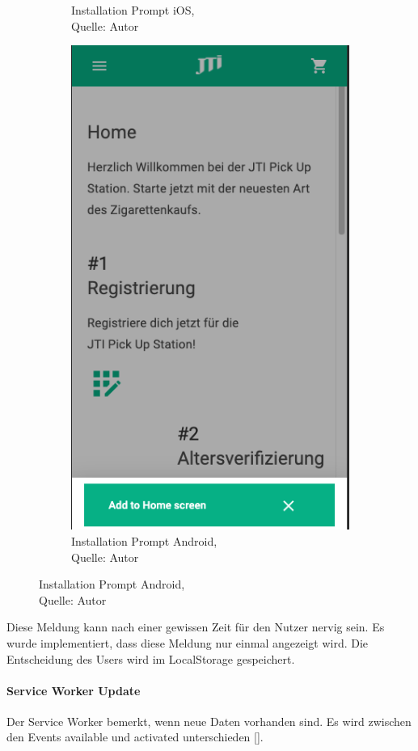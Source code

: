 \begin{figure}[H]
\begin{subfigure}[b]{0.5\textwidth}
		\caption[Installation Prompt iOS]{Installation Prompt iOS,\\ Quelle: Autor}
		\label{img: promptIOS}
	\end{subfigure}
	\hfill
	\begin{subfigure}[b]{0.5\textwidth}
		\includegraphics[scale=0.5]{images/promptAndroid.png}
		\caption[Installation Prompt Android]{Installation Prompt Android,\\ Quelle: Autor}
		\label{img: promptAndroid}
	\end{subfigure}
\end{figure} 

Diese Meldung kann nach einer gewissen Zeit für den Nutzer nervig sein. Es wurde implementiert, dass diese Meldung nur einmal angezeigt wird. Die Entscheidung des Users wird im \gls{LocalStorage} gespeichert. 
\paragraph{Service Worker Update}
Der Service Worker bemerkt, wenn neue Daten vorhanden sind. Es wird zwischen den Events \glqq available\grqq{} und \glqq activated\grqq{} unterschieden [\cite{swupdate}].
\newpage
